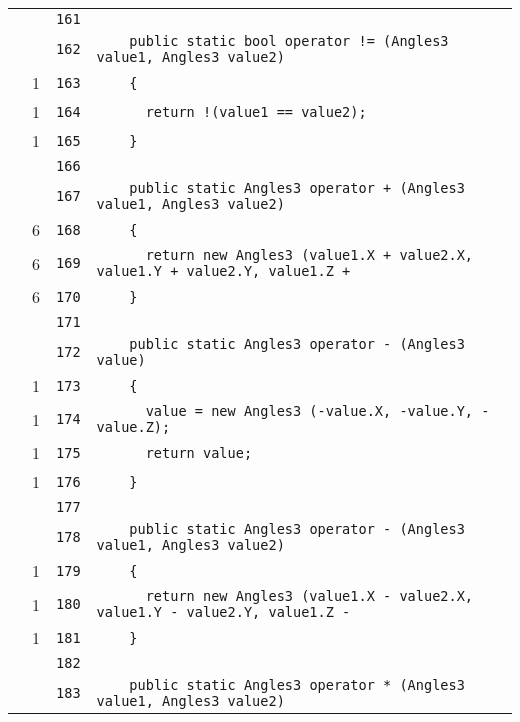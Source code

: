 \documentclass[a4paper,10pt]{article}
\begin{document}
\begin{longtable}[l]{lrrl}
\cellcolor{gray} &  & \verb~161~ & \verb~~\\
\cellcolor{gray} &  & \verb~162~ & \verb~    public static bool operator != (Angles3 value1, Angles3 value2)~\\
\cellcolor{green} & 1 & \verb~163~ & \verb~    {~\\
\cellcolor{green} & 1 & \verb~164~ & \verb~      return !(value1 == value2);~\\
\cellcolor{green} & 1 & \verb~165~ & \verb~    }~\\
\cellcolor{gray} &  & \verb~166~ & \verb~~\\
\cellcolor{gray} &  & \verb~167~ & \verb~    public static Angles3 operator + (Angles3 value1, Angles3 value2)~\\
\cellcolor{green} & 6 & \verb~168~ & \verb~    {~\\
\cellcolor{green} & 6 & \verb~169~ & \verb~      return new Angles3 (value1.X + value2.X, value1.Y + value2.Y, value1.Z +~\\
\cellcolor{green} & 6 & \verb~170~ & \verb~    }~\\
\cellcolor{gray} &  & \verb~171~ & \verb~~\\
\cellcolor{gray} &  & \verb~172~ & \verb~    public static Angles3 operator - (Angles3 value)~\\
\cellcolor{green} & 1 & \verb~173~ & \verb~    {~\\
\cellcolor{green} & 1 & \verb~174~ & \verb~      value = new Angles3 (-value.X, -value.Y, -value.Z);~\\
\cellcolor{green} & 1 & \verb~175~ & \verb~      return value;~\\
\cellcolor{green} & 1 & \verb~176~ & \verb~    }~\\
\cellcolor{gray} &  & \verb~177~ & \verb~~\\
\cellcolor{gray} &  & \verb~178~ & \verb~    public static Angles3 operator - (Angles3 value1, Angles3 value2)~\\
\cellcolor{green} & 1 & \verb~179~ & \verb~    {~\\
\cellcolor{green} & 1 & \verb~180~ & \verb~      return new Angles3 (value1.X - value2.X, value1.Y - value2.Y, value1.Z -~\\
\cellcolor{green} & 1 & \verb~181~ & \verb~    }~\\
\cellcolor{gray} &  & \verb~182~ & \verb~~\\
\cellcolor{gray} &  & \verb~183~ & \verb~    public static Angles3 operator * (Angles3 value1, Angles3 value2)~\\

\end{longtable}
\end{document}
